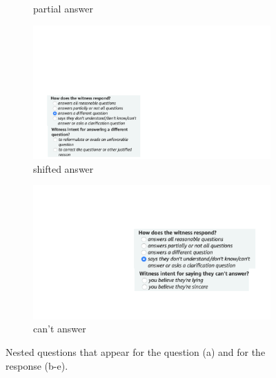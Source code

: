 \begin{figure}
\begin{subfigure}{.34\textwidth}
  \vspace{0.003em}
  \caption{partial answer}
\end{subfigure}%
\begin{subfigure}{.34\textwidth}
  \centering
  \includegraphics[width=1\linewidth]{plots/subj_amt_screenshots_response3.pdf}
  \caption{shifted answer}
\end{subfigure}%
\begin{subfigure}{.34\textwidth}
  \centering
  \includegraphics[width=1\linewidth]{plots/subj_amt_screenshots_response4.pdf}
  \vspace{.481em}
  \caption{can't answer}
\end{subfigure}
\caption{Nested questions that appear for the question (a) and for the response (b-e).}
\label{fig:subj_amt_screenshots_nested}
\end{figure}

